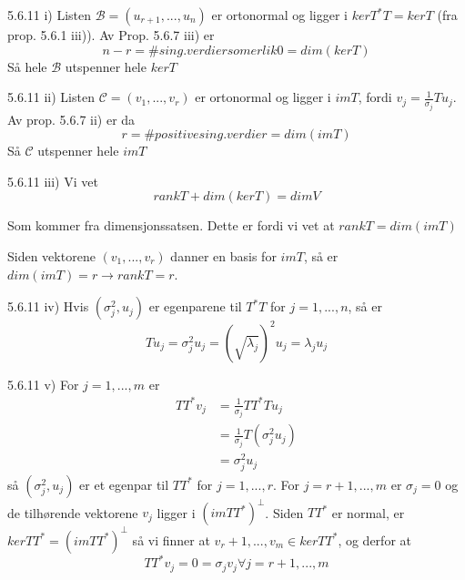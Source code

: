 \documentclass[a4paper,norsk]{article}
\begin{document}
\begin{proofbox}{5.6.11 i)}{}
Listen $ \mathcal{B} = \left( u_{r+1}, ..., u_n \right)  $ er ortonormal og ligger i $ kerT^*T  = kerT$ (fra prop. 5.6.1 iii)). Av Prop. 5.6.7 iii) er 
\[
    n - r = \# sing. verdier som er lik 0 = dim \left( kerT \right) 
\]
Så hele $ \mathcal{B}  $ utspenner hele $ kerT $ 
\end{proofbox}

\begin{proofbox}{5.6.11 ii)}{}
Listen $ \mathcal{C} = \left( v_1, ..., v_r \right)  $ er ortonormal og ligger i $ imT $, fordi $ v_j = \frac{ 1 }{ \sigma_j } Tu_j $. Av prop. 5.6.7 ii) er da 
\[
    r = \# positive sing. verdier = dim \left( im T \right) 
\]
Så $ \mathcal{C} $ utspenner hele $ imT $ 
\end{proofbox}

\begin{proofbox}{5.6.11 iii)}{}
Vi vet 
\[
    rankT + dim \left( ker T \right) = dim V
\]

Som kommer fra dimensjonssatsen. Dette er fordi vi vet at $ rank T = dim \left( im T \right)  $ 

Siden vektorene $ \left( v_1, ..., v_r \right)  $ danner en basis for $ imT $, så er $ dim \left( imT \right)  = r \rightarrow rankT = r$. 
\end{proofbox}

\begin{proofbox}{5.6.11 iv)}{}
Hvis $ \left( \sigma_j^2, u_j \right)  $ er egenparene til $ T^*T $ for $ j = 1, ..., n $, så er 
\[
    Tu_j = \sigma_j^2 u_j = \left( \sqrt{ \lambda _j } \right)^2 u_j = \lambda _j u_j 
\]
\end{proofbox}

\begin{proofbox}{5.6.11 v)}{}
For $ j=1, ..., m $ er 
\begin{align*}
    TT^* v_j &= \frac{ 1 }{ \sigma_j } TT^*Tu_j \\
    &= \frac{ 1 }{ \sigma_j } T \left( \sigma _{ j} ^2 u_j \right) \\
    &= \sigma _{ j} ^2 u_j
\end{align*}
så $ \left( \sigma _{ j} ^2, u_j \right)  $ er et egenpar til $ TT^* $ for $ j=1, ..., r $. For $ j= r+1, ..., m $ er $ \sigma _{ j} = 0 $ og de tilhørende vektorene $ v_j $ ligger i $ \left( imTT^* \right)^{\bot}  $. Siden $ TT^* $ er normal, er $ kerTT^* = \left( imTT^* \right) ^{\bot} $ så vi finner at $ v_r+1, ..., v_m \in ker TT^* $, og derfor at 
\[
    TT^* v_j = 0 = \sigma _{ j} v_j \forall j = r+1, ..., m
\]
\end{proofbox}
\end{document}
